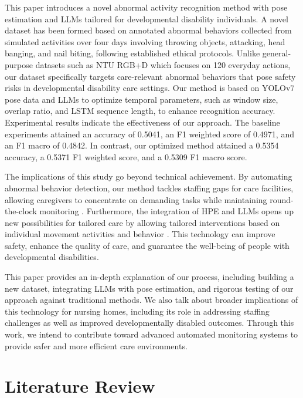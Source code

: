 \documentclass{iopconfser}
\begin{document}
This paper introduces a novel abnormal activity recognition method with pose estimation and LLMs tailored for developmental disability individuals. A novel dataset has been formed based on annotated abnormal behaviors collected from simulated activities over four days involving throwing objects, attacking, head banging, and nail biting, following established ethical protocols. Unlike general-purpose datasets such as NTU RGB+D \cite{shahroudy2016ntu} which focuses on 120 everyday actions, our dataset specifically targets care-relevant abnormal behaviors that pose safety risks in developmental disability care settings. Our method is based on YOLOv7 pose data and LLMs to optimize temporal parameters, such as window size, overlap ratio, and LSTM sequence length, to enhance recognition accuracy. Experimental results indicate the effectiveness of our approach. The baseline experiments attained an accuracy of 0.5041, an F1 weighted score of 0.4971, and an F1 macro of 0.4842. In contrast, our optimized method attained a 0.5354 accuracy, a 0.5371 F1 weighted score, and a 0.5309 F1 macro score.

The implications of this study go beyond technical achievement. By automating abnormal behavior detection, our method tackles staffing gaps for care facilities, allowing caregivers to concentrate on demanding tasks while maintaining round-the-clock monitoring \cite{emerson2014health}. Furthermore, the integration of HPE and LLMs opens up new possibilities for tailored care by allowing tailored interventions based on individual movement activities and behavior \cite{bulling2014tutorial}. This technology can improve safety, enhance the quality of care, and guarantee the well-being of people with developmental disabilities.

This paper provides an in-depth explanation of our process, including building a new dataset, integrating LLMs with pose estimation, and rigorous testing of our approach against traditional methods. We also talk about broader implications of this technology for nursing homes, including its role in addressing staffing challenges as well as improved developmentally disabled outcomes. Through this work, we intend to contribute toward advanced automated monitoring systems to provide safer and more efficient care environments.

\section{Literature Review}
\end{document}
